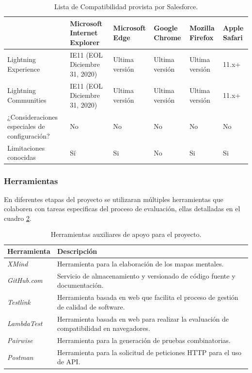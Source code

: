 \begin{table}
\centering
\begin{tabular}{|p{4.5cm}|p{1.9cm}|p{1.9cm}|p{1.9cm}|p{1.9cm}|p{1.9cm}|}
\hline
& \textbf{Microsoft Internet Explorer} & \textbf{Microsoft Edge} & \textbf{Google Chrome} & \textbf{Mozilla Firefox} & \textbf{Apple Safari} \\
\hline
Lightning Experience & IE11 (EOL Diciembre 31, 2020) & Ultima versión & Ultima versión & Ultima versión & 11.x+ \\
Lightning Communities & IE11 (EOL Diciembre 31, 2020) & Ultima versión & Ultima versión & Ultima versión & 11.x+ \\
¿Consideraciones especiales de configuración? & No & No & No & No & No \\
Limitaciones conocidas & Sí & Si & No & Si & Si \\
\hline
\end{tabular}
\caption{Lista de Compatibilidad provista por Salesforce.}
\label{soporte_navegadores}
\end{table}

\subsubsection{Herramientas}
En diferentes etapas del proyecto se utilizaran múltiples herramientas que
colaboren con tareas especificas del proceso de evaluación, ellas detalladas en
el cuadro \ref{herramientas}.

\begin{table}
\centering
\begin{tabular}{|l|p{13.5cm}|}
\hline
\textbf{Herramienta} & \textbf{Descripción} \\
\hline
\emph{XMind} & Herramienta para la elaboración de los mapas mentales. \\
\emph{GitHub.com} & Servicio de almacenamiento y versionado de código fuente y documentación. \\
\emph{Testlink} & Herramienta basada en web que facilita el proceso de gestión de calidad de software. \\
\emph{LambdaTest} & Herramienta basada en web para realizar la evaluación de compatibilidad en navegadores. \\
\emph{Pairwise} & Herramienta para la generación de pruebas combinatorias. \\
\emph{Postman} & Herramienta para la solicitud de peticiones HTTP para el uso de API.\\
\hline
\end{tabular}
\caption{Herramientas auxiliares de apoyo para el proyecto.}
\label{herramientas}
\end{table}

